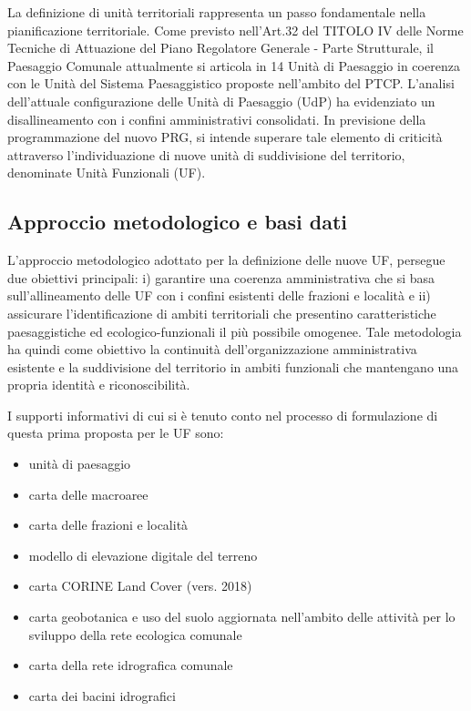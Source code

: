 \documentclass[
  a4paper,
]{book}
\providecommand{\tightlist}{%
  \setlength{\itemsep}{0pt}\setlength{\parskip}{0pt}}
\begin{document}
La definizione di unità territoriali rappresenta un passo fondamentale nella pianificazione territoriale.
Come previsto nell'Art.32 del TITOLO IV delle Norme Tecniche di Attuazione del Piano Regolatore Generale - Parte Strutturale, il Paesaggio Comunale attualmente si articola in 14 Unità di Paesaggio in coerenza con le Unità del Sistema Paesaggistico proposte nell'ambito del PTCP.
L'analisi dell'attuale configurazione delle Unità di Paesaggio (UdP) ha evidenziato un disallineamento con i confini amministrativi consolidati.
In previsione della programmazione del nuovo PRG, si intende superare tale elemento di criticità attraverso l'individuazione di nuove unità di suddivisione del territorio, denominate Unità Funzionali (UF).

\subsection{Approccio metodologico e basi dati}\label{approccio-metodologico-e-basi-dati}

L'approccio metodologico adottato per la definizione delle nuove UF, persegue due obiettivi principali: i) garantire una coerenza amministrativa che si basa sull'allineamento delle UF con i confini esistenti delle frazioni e località e ii) assicurare l'identificazione di ambiti territoriali che presentino caratteristiche paesaggistiche ed ecologico-funzionali il più possibile omogenee.
Tale metodologia ha quindi come obiettivo la continuità dell'organizzazione amministrativa esistente e la suddivisione del territorio in ambiti funzionali che mantengano una propria identità e riconoscibilità.

I supporti informativi di cui si è tenuto conto nel processo di formulazione di questa prima proposta per le UF sono:

\begin{itemize}
\tightlist
\item
  unità di paesaggio
\item
  carta delle macroaree
\item
  carta delle frazioni e località
\item
  modello di elevazione digitale del terreno
\item
  carta CORINE Land Cover (vers. 2018)
\item
  carta geobotanica e uso del suolo aggiornata nell'ambito delle attività per lo sviluppo della rete ecologica comunale
\item
  carta della rete idrografica comunale
\item
  carta dei bacini idrografici
\end{itemize}
\end{document}
